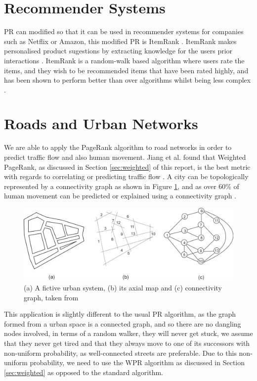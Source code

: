 \documentclass[11pt]{report}
\begin{document}
\section{Recommender Systems} \label{sec:recommender}
PR can modified so that it can be used in recommender systems for companies such as Netflix or Amazon, this modified PR is ItemRank \cite{gleich2015pagerank}. ItemRank makes personalised product sugestions by extracting knowledge for the users prior interactions \cite{gori2007itemrank}. ItemRank is a random-walk based algorithm where users rate the items, and they wish to be recommended items that have been rated highly, and has been shown to perform better than over algorithms whilst being less complex \cite{gori2007itemrank}.


\section{Roads and Urban Networks} \label{sec:Roads}
We are able to apply the PageRank algorithm to road networks in order to predict traffic flow and also human movement. Jiang et al. found that Weighted PageRank, as discussed in Section \ref{sec:weighted} of this report, is the best metric with regards to correlating or predicting traffic flow \cite{1742-5468-2008-07-P07008}. A city can be topologically represented by a connectivity graph as shown in Figure \ref{fig:city rep}, and as over 60\% of human movement can be predicted or explained using a connectivity graph \cite{doi:10.1080/13658810802022822}.

\begin{figure}[h!]
\centering
\includegraphics[width=\linewidth]{map_view.jpeg}
\caption{(a) A fictive urban system, (b) its axial map and (c) connectivity graph, taken from \cite{doi:10.1080/13658810802022822}}
\label{fig:city rep}
\end{figure}

This application is slightly different to the usual PR algorithm, as the graph formed from a urban space is a connected graph, and so there are no dangling nodes involved, in terms of a random walker, they will never get stuck, we assume that they never get tired and that they always move to one of its successors with non-uniform probability, as well-connected streets are preferable. Due to this non-uniform probability, we need to use the WPR algorithm as discussed in Section \ref{sec:weighted} as opposed to the standard algorithm.
\end{document}
